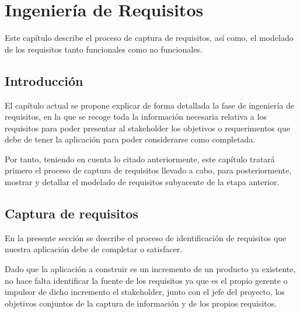 \documentclass[a4paper,12pt]{book}
\begin{document}
		
		
	 
	  \afterpage{\null\newpage}
	 \newpage
	 
	

	\chapter{Ingeniería de Requisitos}
	
	Este capítulo describe el proceso de captura de requisitos, así como, el modelado de los requisitos tanto funcionales como no funcionales.
	
	\minitoc
	
	
	
		\section{Introducción}
		
		El capítulo actual se propone explicar de forma detallada la fase de ingeniería de requisitos, en la que se recoge toda la información necesaria relativa a los requisitos para poder presentar al stakeholder los objetivos o requerimentos que debe de tener la aplicación para poder considerarse como completada.
		
		\vspace{5mm}
		
		Por tanto, teniendo en cuenta lo citado anteriormente, este capítulo tratará primero el proceso de captura de requisitos llevado a cabo, para posteriormente, mostrar y detallar el modelado de requisitos subyacente de la etapa anterior.
		
		\section{Captura de requisitos}
		
		En la presente sección se describe el proceso de identificación de requisitos que nuestra aplicación debe de completar o satisfacer. 
		
		\vspace{5mm}
		
		Dado que la aplicación a construir es un incremento de un producto ya existente, no hace falta identificar la fuente de los requisitos ya que es el propio gerente o impulsor de dicho incremento el stakeholder, junto con el jefe del proyecto, los objetivos conjuntos de la captura de información y de los propios requisitos.
		
		\vspace{5mm}
		
\end{document}

